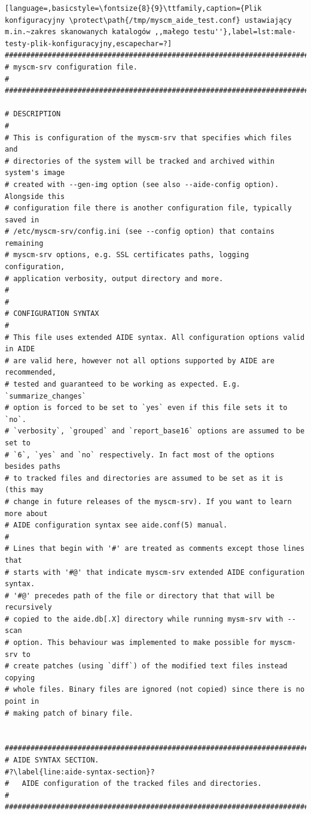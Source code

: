 \documentclass[thesis]{subfiles}
\begin{document}
\newpage
\begin{lstlisting}[language=,basicstyle=\fontsize{8}{9}\ttfamily,caption={Plik konfiguracyjny \protect\path{/tmp/myscm_aide_test.conf} ustawiający m.in.~zakres skanowanych katalogów ,,małego testu''},label=lst:male-testy-plik-konfiguracyjny,escapechar=?]
###############################################################################
# myscm-srv configuration file.                                               #
###############################################################################

# DESCRIPTION
#
# This is configuration of the myscm-srv that specifies which files and
# directories of the system will be tracked and archived within system's image
# created with --gen-img option (see also --aide-config option). Alongside this
# configuration file there is another configuration file, typically saved in
# /etc/myscm-srv/config.ini (see --config option) that contains remaining
# myscm-srv options, e.g. SSL certificates paths, logging configuration,
# application verbosity, output directory and more.
#
#
# CONFIGURATION SYNTAX
#
# This file uses extended AIDE syntax. All configuration options valid in AIDE
# are valid here, however not all options supported by AIDE are recommended,
# tested and guaranteed to be working as expected. E.g. `summarize_changes`
# option is forced to be set to `yes` even if this file sets it to `no`.
# `verbosity`, `grouped` and `report_base16` options are assumed to be set to
# `6`, `yes` and `no` respectively. In fact most of the options besides paths
# to tracked files and directories are assumed to be set as it is (this may
# change in future releases of the myscm-srv). If you want to learn more about
# AIDE configuration syntax see aide.conf(5) manual.
#
# Lines that begin with '#' are treated as comments except those lines that
# starts with '#@' that indicate myscm-srv extended AIDE configuration syntax.
# '#@' precedes path of the file or directory that that will be recursively
# copied to the aide.db[.X] directory while running mysm-srv with --scan
# option. This behaviour was implemented to make possible for myscm-srv to
# create patches (using `diff`) of the modified text files instead copying
# whole files. Binary files are ignored (not copied) since there is no point in
# making patch of binary file.


###############################################################################
# AIDE SYNTAX SECTION.                                                        #?\label{line:aide-syntax-section}?
#   AIDE configuration of the tracked files and directories.                  #
###############################################################################


\end{lstlisting}
\end{document}
